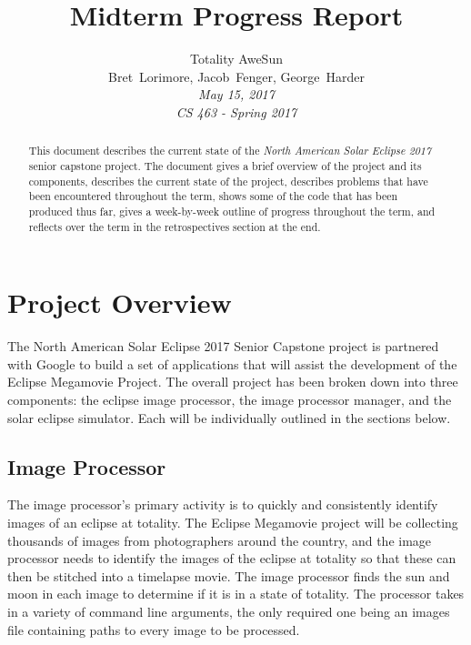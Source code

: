 \documentclass[10pt, onecolumn, draftclsnofoot, letterpaper, compsoc]{IEEEtran}
\title{Midterm Progress Report}
\author{Totality AweSun \\
		Bret~Lorimore, Jacob~Fenger, George~Harder \\
		\textit{May 15, 2017 \\
		CS 463 - Spring 2017}}
\begin{document}
\maketitle

\begin{abstract}
This document describes the current state of the \textit{North American Solar Eclipse 2017}
senior capstone project. The document gives a brief overview of the project and its components,
describes the current state of the project, describes problems that have been
encountered throughout the term, shows some of the code that has been produced thus far, gives
a week-by-week outline of progress throughout the term, and reflects over the term in the
retrospectives section at the end.
\end{abstract}

\newpage

\tableofcontents

\newpage

\section{Project Overview}

The North American Solar Eclipse 2017 Senior Capstone project is partnered
with Google to build a set of applications that will assist the development of
the Eclipse Megamovie Project. The overall project has been broken down into
three components: the eclipse image processor, the image processor manager, and
the solar eclipse simulator. Each will be individually outlined in the sections
below. \\

\subsection{Image Processor}

The image processor’s primary activity is to quickly and consistently identify
images of an eclipse at totality. The Eclipse Megamovie project will be
collecting thousands of images from photographers around the country, and the
image processor needs to identify the images of the eclipse at totality so that
these can then be stitched into a timelapse movie. The image processor finds the
sun and moon in each image to determine if it is in a state of totality. The
processor takes in a variety of command line arguments, the only required
one being an images file containing paths to every image to be processed.
\end{document}
